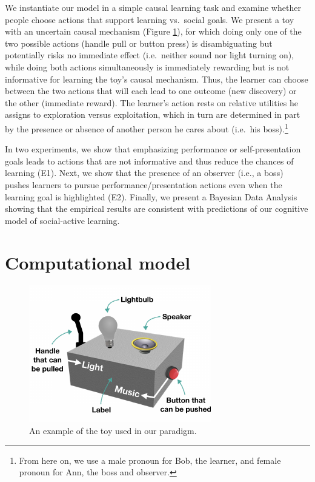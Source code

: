 \documentclass[10pt, letterpaper]{article}
\newenvironment{CodeChunk}{}{}
\begin{document}
We instantiate our model in a simple causal learning task and examine
whether people choose actions that support learning vs.~social goals. We
present a toy with an uncertain causal mechanism (Figure \ref{fig:toy}),
for which doing only one of the two possible actions (handle pull or
button press) is disambiguating but potentially risks no immediate
effect (i.e.~neither sound nor light turning on), while doing both
actions simultaneously is immediately rewarding but is not informative
for learning the toy's causal mechanism. Thus, the learner can choose
between the two actions that will each lead to one outcome (new
discovery) or the other (immediate reward). The learner's action rests
on relative utilities he assigns to exploration versus exploitation,
which in turn are determined in part by the presence or absence of
another person he cares about (i.e.~his
boss).\footnote{From here on, we use a male pronoun for Bob, the learner, and female pronoun for Ann, the boss and observer.}

In two experiments, we show that emphasizing performance or
self-presentation goals leads to actions that are not informative and
thus reduce the chances of learning (E1). Next, we show that the
presence of an observer (i.e., a boss) pushes learners to pursue
performance/presentation actions even when the learning goal is
highlighted (E2). Finally, we present a Bayesian Data Analysis showing
that the empirical results are consistent with predictions of our
cognitive model of social-active learning.

\section{Computational model}\label{computational-model}

\begin{CodeChunk}
\begin{figure}[t]

{\centering \includegraphics[width=0.65\linewidth]{figs/toy-1} 

}

\caption[An example of the toy used in our paradigm]{An example of the toy used in our paradigm.}\label{fig:toy}
\end{figure}
\end{CodeChunk}
\end{document}

